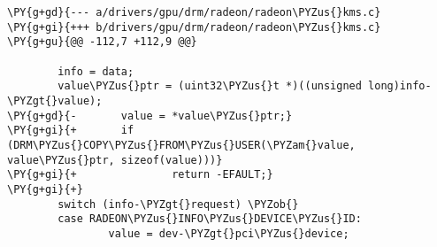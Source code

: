 \begin{Verbatim}[commandchars=\\\{\}]
\PY{g+gd}{--- a/drivers/gpu/drm/radeon/radeon\PYZus{}kms.c}
\PY{g+gi}{+++ b/drivers/gpu/drm/radeon/radeon\PYZus{}kms.c}
\PY{g+gu}{@@ -112,7 +112,9 @@}

        info = data;
        value\PYZus{}ptr = (uint32\PYZus{}t *)((unsigned long)info-\PYZgt{}value);
\PY{g+gd}{-       value = *value\PYZus{}ptr;}
\PY{g+gi}{+       if (DRM\PYZus{}COPY\PYZus{}FROM\PYZus{}USER(\PYZam{}value, value\PYZus{}ptr, sizeof(value)))}
\PY{g+gi}{+               return -EFAULT;}
\PY{g+gi}{+}
        switch (info-\PYZgt{}request) \PYZob{}
        case RADEON\PYZus{}INFO\PYZus{}DEVICE\PYZus{}ID:
                value = dev-\PYZgt{}pci\PYZus{}device;
\end{Verbatim}

